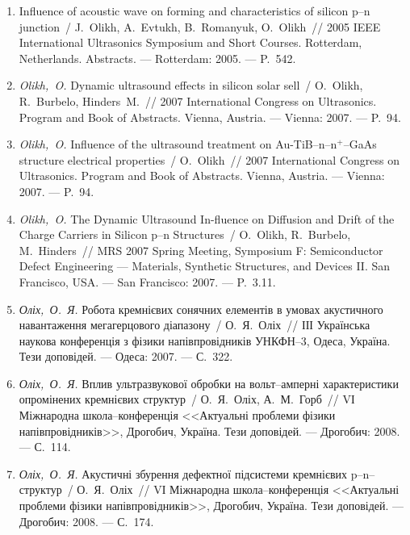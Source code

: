 \begin{enumerate}[label=\arabic*.,leftmargin=1cm,itemindent=0cm]
\item
Influence of acoustic wave on forming and characteristics of silicon p--n
  junction~/ J.~Olikh, A.~Evtukh, B.~Romanyuk, O.~Olikh~// 2005 {IEEE}
  {I}nternational {U}ltrasonics {S}ymposium and {S}hort {C}ourses. Rotterdam,
  {N}etherlands. Abstracts. ---
  Rotterdam: 2005. ---
  P.~542.

\item
\emph{Olikh,~O.} Dynamic ultrasound effects in silicon solar sell~/
  O.~Olikh, R.~Burbelo, Hinders~M.~// 2007 {I}nternational {C}ongress on
  {U}ltrasonics. {P}rogram and {B}ook of {A}bstracts. {V}ienna, {A}ustria. ---
  Vienna: 2007. ---
  P.~94.

\item
\emph{Olikh,~O.} Influence of the ultrasound treatment on
  {A}u-{T}i{B}--n--n$^+$--{G}a{A}s structure electrical properties~/
  O.~Olikh~// 2007 {I}nternational {C}ongress on {U}ltrasonics. {P}rogram and
  {B}ook of {A}bstracts. {V}ienna, {A}ustria. ---
  Vienna: 2007. ---
  P.~94.

\item
\emph{Olikh,~O.} The Dynamic Ultrasound In-fluence on Diffusion and Drift of
  the Charge Carriers in Silicon p--n Structures~/ O.~Olikh, R.~Burbelo,
  M.~Hinders~// {MRS} 2007 {S}pring {M}eeting, {S}ymposium {F}: {S}emiconductor
  {D}efect {E}ngineering --- {M}aterials, {S}ynthetic {S}tructures, and
  {D}evices {II}. San {F}rancisco, {USA}. ---
  San {F}rancisco: 2007. ---
  P.~3.11.

\item
\emph{Оліх,~О.~Я.} Робота кремнієвих сонячних
  елементів в умовах акустичного
  навантаження мегагерцового діапазону~/
  О.~Я.~Оліх~// {ІІІ} {У}країнська наукова
  конференція з фізики напівпровідників
  {УНКФН}--3, {О}деса, {У}країна. Тези доповідей.
  ---
  Одеса: 2007. ---
  {С.}~322.

\item
\emph{Оліх,~О.~Я.} Вплив ультразвукової
  обробки на вольт--амперні характеристики
  опромінених кремнієвих структур~/
  О.~Я.~Оліх, А.~М.~Горб~// {VІ} {М}іжнародна
  школа--конференція <<Актуальні проблеми
  фізики напівпровідників>>, {Д}рогобич,
  {У}країна. Тези доповідей. ---
  Дрогобич: 2008. ---
  {С.}~114.

\item
\emph{Оліх,~О.~Я.} Акустичні збурення
  дефектної підсистеми кремнієвих
  p--n--структур~/ О.~Я.~Оліх~// {VІ} {М}іжнародна
  школа--конференція <<Актуальні проблеми
  фізики напівпровідників>>, {Д}рогобич,
  {У}країна. Тези доповідей. ---
  Дрогобич: 2008. ---
  {С.}~174.


\end{enumerate}
